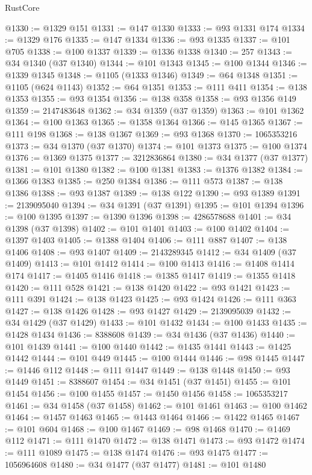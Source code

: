 \begin{lexlean}{RustCore}
\begin{coremodule}
@1330 := @1329 @151
@1331 := @147 @1330
@1333 := @93 @1331 @174
@1334 := @1329 @176
@1335 := @147 @1334
@1336 := @93 @1335
@1337 := @101 @705
@1338 := @100 @1337
@1339 := @1336 @1338
@1340 := 257
@1343 := @34 @1340 (@37 @1340)
@1344 := @101 @1343
@1345 := @100 @1344
@1346 := @1339 @1345
@1348 := @1105 (@1333 @1346)
@1349 := @64 @1348
@1351 := @1105 (@624 @1143)
@1352 := @64 @1351
@1353 := @111 @411
@1354 := @138 @1353
@1355 := @93 @1354
@1356 := @138 @358
@1358 := @93 @1356 @149
@1359 := 2147483648
@1362 := @34 @1359 (@37 @1359)
@1363 := @101 @1362
@1364 := @100 @1363
@1365 := @1358 @1364
@1366 := @145 @1365
@1367 := @111 @198
@1368 := @138 @1367
@1369 := @93 @1368
@1370 := 1065353216
@1373 := @34 @1370 (@37 @1370)
@1374 := @101 @1373
@1375 := @100 @1374
@1376 := @1369 @1375
@1377 := 3212836864
@1380 := @34 @1377 (@37 @1377)
@1381 := @101 @1380
@1382 := @100 @1381
@1383 := @1376 @1382
@1384 := @1366 @1383
@1385 := @250 @1384
@1386 := @111 @573
@1387 := @138 @1386
@1388 := @93 @1387
@1389 := @138 @122
@1390 := @93 @1389
@1391 := 2139095040
@1394 := @34 @1391 (@37 @1391)
@1395 := @101 @1394
@1396 := @100 @1395
@1397 := @1390 @1396
@1398 := 4286578688
@1401 := @34 @1398 (@37 @1398)
@1402 := @101 @1401
@1403 := @100 @1402
@1404 := @1397 @1403
@1405 := @1388 @1404
@1406 := @111 @887
@1407 := @138 @1406
@1408 := @93 @1407
@1409 := 2143289345
@1412 := @34 @1409 (@37 @1409)
@1413 := @101 @1412
@1414 := @100 @1413
@1416 := @1408 @1414 @174
@1417 := @1405 @1416
@1418 := @1385 @1417
@1419 := @1355 @1418
@1420 := @111 @528
@1421 := @138 @1420
@1422 := @93 @1421
@1423 := @111 @391
@1424 := @138 @1423
@1425 := @93 @1424
@1426 := @111 @363
@1427 := @138 @1426
@1428 := @93 @1427
@1429 := 2139095039
@1432 := @34 @1429 (@37 @1429)
@1433 := @101 @1432
@1434 := @100 @1433
@1435 := @1428 @1434
@1436 := 8388608
@1439 := @34 @1436 (@37 @1436)
@1440 := @101 @1439
@1441 := @100 @1440
@1442 := @1435 @1441
@1443 := @1425 @1442
@1444 := @101 @449
@1445 := @100 @1444
@1446 := @98 @1445
@1447 := @1446 @112
@1448 := @111 @1447
@1449 := @138 @1448
@1450 := @93 @1449
@1451 := 8388607
@1454 := @34 @1451 (@37 @1451)
@1455 := @101 @1454
@1456 := @100 @1455
@1457 := @1450 @1456
@1458 := 1065353217
@1461 := @34 @1458 (@37 @1458)
@1462 := @101 @1461
@1463 := @100 @1462
@1464 := @1457 @1463
@1465 := @1443 @1464
@1466 := @1422 @1465
@1467 := @101 @604
@1468 := @100 @1467
@1469 := @98 @1468
@1470 := @1469 @112
@1471 := @111 @1470
@1472 := @138 @1471
@1473 := @93 @1472
@1474 := @111 @1089
@1475 := @138 @1474
@1476 := @93 @1475
@1477 := 1056964608
@1480 := @34 @1477 (@37 @1477)
@1481 := @101 @1480

\end{coremodule}
\end{lexlean}
